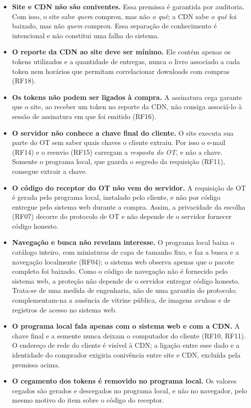 \documentclass[12pt, oneside, a4paper, english, brazil]{abntex2}
\begin{document}
\begin{itemize}
\item \textbf{Site e CDN não são coniventes.} Essa premissa é garantida por
auditoria. Com isso, o site sabe \emph{quem} comprou, mas não \emph{o quê}; a
CDN sabe \emph{o quê} foi baixado, mas não \emph{quem} comprou. Essa separação
de conhecimento é intencional e não constitui uma falha do sistema.

\item \textbf{O reporte da CDN ao site deve ser mínimo.} Ele contém apenas os
tokens utilizados e a quantidade de entregas, nunca o livro associado a cada
token nem horários que permitam correlacionar downloads com compras (RF18).

\item \textbf{Os tokens não podem ser ligados à compra.} A assinatura cega
garante que o site, ao receber um token no reporte da CDN, não consiga
associá-lo à sessão de assinatura em que foi emitido (RF16).

\item \textbf{O servidor não conhece a chave final do cliente.} O site executa
sua parte do OT sem saber quais chaves o cliente extraiu. Por isso o e-mail
(RF14) e o reenvio (RF15) carregam a \emph{resposta do OT}, e não a chave.
Somente o programa local, que guarda o segredo da requisição (RF11), consegue
extrair a chave.

\item \textbf{O código do receptor do OT não vem do servidor.} A requisição de
OT é gerada pelo programa local, instalado pelo cliente, e não por código
entregue pelo sistema web durante a compra. Assim, a privacidade da escolha
(RF07) decorre do protocolo de OT e não depende de o servidor fornecer código
honesto.

\item \textbf{Navegação e busca não revelam interesse.} O programa local
baixa o catálogo inteiro, com miniaturas de capa de tamanho fixo, e faz a
busca e a navegação localmente (RF04); o sistema web observa apenas que o
pacote completo foi baixado. Como o código de navegação não é fornecido pelo
sistema web, a proteção não depende de o servidor entregar código honesto.
Trata-se de uma medida de engenharia, não de uma garantia do protocolo;
complementam-na a ausência de vitrine pública, de imagens avulsas e de
registros de acesso no sistema web.

\item \textbf{O programa local fala apenas com o sistema web e com a CDN.} A
chave final e a semente nunca deixam o computador do cliente (RF10, RF11). O
endereço de rede do cliente é visível à CDN; a ligação entre esse dado e a
identidade do comprador exigiria conivência entre site e CDN, excluída pela
premissa acima.

\item \textbf{O cegamento dos tokens é removido no programa local.} Os valores
cegados são gerados e descegados no programa local, e não no navegador, pelo
mesmo motivo do item sobre o código do receptor.
\end{itemize}
\end{document}
